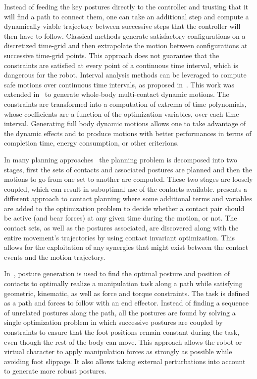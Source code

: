 Instead of feeding the key postures directly to the controller and trusting that it will find a path to connect them, one can take an additional step and compute a dynamically viable trajectory between successive steps that the controller will then have to follow.
Classical methods generate satisfactory configurations on a discretized time-grid and then extrapolate the motion between configurations at successive time-grid points.
This approach does not guarantee that the constraints are satisfied at every point of a continuous time interval, which is dangerous for the robot.
Interval analysis methods can be leveraged to compute safe motions over continuous time intervals, as proposed in~\cite{lengagne2011planning}.
This work was extended in~\cite{lengagne2013generation} to generate whole-body multi-contact dynamic motions.
The constraints are transformed into a computation of extrema of time polynomials, whose coefficients are a function of the optimization variables, over each time interval.
Generating full body dynamic motions allows one to take advantage of the dynamic effects and to produce motions with better performances in terms of completion time, energy consumption, or other criterions.

In many planning approaches~\cite{kuffner2005motion, chestnutt2007navigation, hauser:ijrr:2008, kolter2008control, bouyarmane:icra:2011} the planning problem is decomposed into two stages, first the sets of contacts and associated postures are planned and then the motions to go from one set to another are computed.
These two stages are loosely coupled, which can result in suboptimal use of the contacts available.
\cite{mordatch:acm:2012} presents a different approach to contact planning where some additional terms and variables are added to the optimization problem to decide whether a contact pair should be active (and bear forces) at any given time during the motion, or not.
The contact sets, as well as the postures associated, are discovered along with the entire movement's trajectories by using contact invariant optimization.
This allows for the exploitation of any synergies that might exist between the contact events and the motion trajectory.

In~\cite{liu:acm:2012}, posture generation is used to find the optimal posture and position of contacts to optimally realize a manipulation task along a path while satisfying geometric, kinematic, as well as force and torque constraints.
The task is defined as a path and forces to follow with an end effector.
Instead of finding a sequence of unrelated postures along the path, all the postures are found by solving a single optimization problem in which successive postures are coupled by constraints to ensure that the foot positions remain constant during the task, even though the rest of the body can move.
This approach allows the robot or virtual character to apply manipulation forces as strongly as possible while avoiding foot slippage.
It also allows taking external perturbations into account to generate more robust postures.

